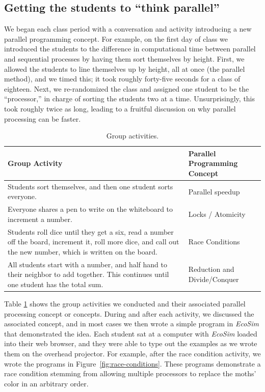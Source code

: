 \documentclass{sig-alternate}
\begin{document}
\subsection{Getting the students to ``think parallel''}
We began each class period with a conversation and activity introducing a new parallel programming concept. 
For example, on the first day of class we introduced the students to the difference in
computational time between parallel and sequential processes by having them sort themselves
by height.  First, we allowed the students to line themselves up by height, all at once (the
parallel method), and we timed this; it took roughly forty-five seconds for a class of eighteen.
Next, we re-randomized the class and assigned one student to be the ``processor,'' in charge
of sorting the students two at a time.  Unsurprisingly, this took roughly twice as long, 
leading to a fruitful discussion on why parallel processing can be faster.

\begin{table}
\centering \begin{tabular}{p{.7\linewidth} | p{.25\linewidth}} 
\toprule
Group Activity               &  Parallel Programming Concept \\ \midrule
Students sort themselves, and then one student sorts everyone.     & Parallel speedup \\ \hline
Everyone shares a pen to write on the whiteboard to increment a number. & Locks / Atomicity  \\ \hline
Students roll dice until they get a six, read a number off the board, increment it, roll more dice, and call out the new number, which is written on the board.   & Race Conditions \\ \hline
All students start with a number, and half hand to their neighbor to add together.
This continues until one student has the total sum. & Reduction and Divide/Conquer  \\
\bottomrule 
\end{tabular}
\caption{Group activities.}
\label{tab:group-activities}
\end{table} 

Table \ref{tab:group-activities} shows the group activities we conducted and their associated
parallel processing concept or concepts.  During and after each activity, we discussed the
associated concept, and in most cases we then wrote a simple program in \emph{EcoSim} that
demonstrated the idea.  Each student sat at a computer with \emph{EcoSim} loaded into their
web browser, and they were able to type out the examples as we wrote them on the overhead 
projector.
For example, after the race condition activity, we wrote the programs in Figure~\ref{fig:race-conditions}. 
These programs demonstrate a race condition stemming from allowing multiple
processors to replace the moths' color in an arbitrary order.
\end{document}
